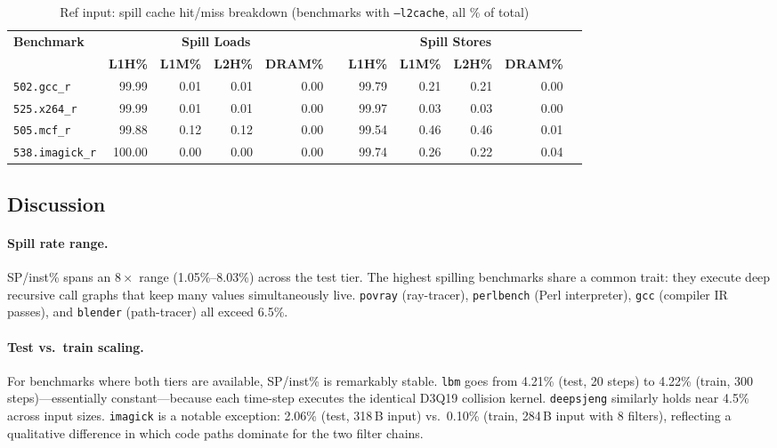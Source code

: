 \documentclass[11pt,a4paper]{article}
\begin{document}
\begin{table}[H]
\centering
\caption{Ref input: spill cache hit/miss breakdown (benchmarks with \texttt{--l2cache}, all \% of total)}
\label{tab:sum_ref_cache}
\small
\begin{tabular}{lrrrrrrrrrr}
\toprule
\multirow{2}{*}{\textbf{Benchmark}} &
\multicolumn{4}{c}{\textbf{Spill Loads}} & \phantom{x} &
\multicolumn{4}{c}{\textbf{Spill Stores}} \\
\cmidrule{2-5}\cmidrule{7-10}
 & \textbf{L1H\%} & \textbf{L1M\%} & \textbf{L2H\%} & \textbf{DRAM\%} &
   & \textbf{L1H\%} & \textbf{L1M\%} & \textbf{L2H\%} & \textbf{DRAM\%} \\
\midrule
\texttt{502.gcc\_r} & 99.99 & 0.01 & 0.01 & 0.00 & & 99.79 & 0.21 & 0.21 & 0.00 \\
\texttt{525.x264\_r} & 99.99 & 0.01 & 0.01 & 0.00 & & 99.97 & 0.03 & 0.03 & 0.00 \\
\texttt{505.mcf\_r} & 99.88 & 0.12 & 0.12 & 0.00 & & 99.54 & 0.46 & 0.46 & 0.01 \\
\texttt{538.imagick\_r} & 100.00 & 0.00 & 0.00 & 0.00 & & 99.74 & 0.26 & 0.22 & 0.04 \\
\bottomrule
\end{tabular}
\end{table}


\subsection{Discussion}

\paragraph{Spill rate range.}
SP/inst\% spans an $8\times$ range (1.05\%--8.03\%) across the test
tier.  The highest spilling benchmarks share a common trait: they
execute deep recursive call graphs that keep many values simultaneously
live.  \texttt{povray} (ray-tracer), \texttt{perlbench} (Perl
interpreter), \texttt{gcc} (compiler IR passes), and \texttt{blender}
(path-tracer) all exceed 6.5\%.

\paragraph{Test vs.\ train scaling.}
For benchmarks where both tiers are available, SP/inst\% is
remarkably stable.  \texttt{lbm} goes from 4.21\% (test, 20 steps)
to 4.22\% (train, 300 steps)---essentially constant---because each
time-step executes the identical D3Q19 collision kernel.
\texttt{deepsjeng} similarly holds near 4.5\% across input sizes.
\texttt{imagick} is a notable exception: 2.06\% (test, 318\,B input)
vs.\ 0.10\% (train, 284\,B input with 8 filters),
reflecting a qualitative difference in which code paths dominate for
the two filter chains.
\end{document}
